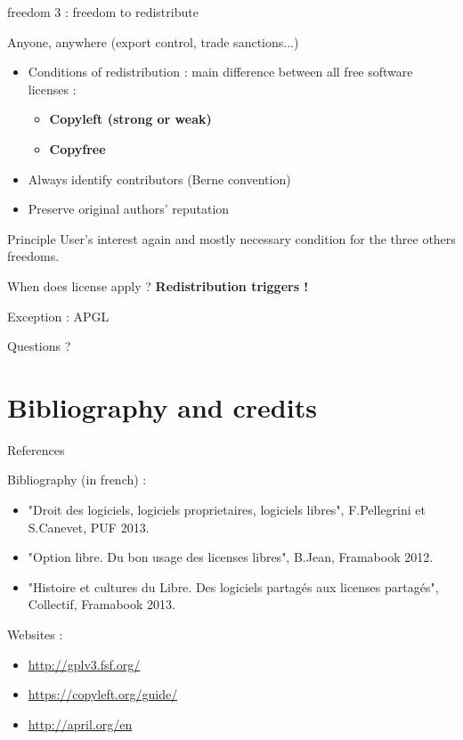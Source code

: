 \documentclass{beamer}
\begin{document}
\begin{frame}{freedom 3 : freedom to redistribute}

Anyone, anywhere (export control, trade sanctions...)

  \begin{itemize}
  \item Conditions of redistribution : main difference between all free software licenses :
    \begin{itemize}
    \item \textbf{Copyleft (strong or weak)}
    \item \textbf{Copyfree}
    \end{itemize}
  \item Always identify contributors (Berne convention)
  \item Preserve original authors' reputation
  \end{itemize}
\begin{alertblock}{Principle}
    User's interest again and mostly necessary condition for the three others freedoms.
  \end{alertblock}

\begin{alertblock}{When does license apply ?}
\textbf{Redistribution triggers !}
 \end{alertblock}
 
 Exception : APGL 
\end{frame}

\begin{frame}
  Questions ?
\end{frame}

\section{Bibliography and credits}

\begin{frame}{References}

Bibliography (in french) :

  \begin{itemize}
  \item "Droit des logiciels, logiciels proprietaires, logiciels libres", F.Pellegrini et S.Canevet, PUF 2013.
  \item "Option libre. Du bon usage des licenses libres", B.Jean, Framabook 2012.
  \item "Histoire et cultures du Libre. Des logiciels partagés aux licenses partagés", Collectif, Framabook 2013.
  \end{itemize}

Websites :

\begin{itemize}
\item \url{http://gplv3.fsf.org/}
\item \url{https://copyleft.org/guide/}
\item \url{http://april.org/en}
\end{itemize}
  
\end{frame}
\end{document}
